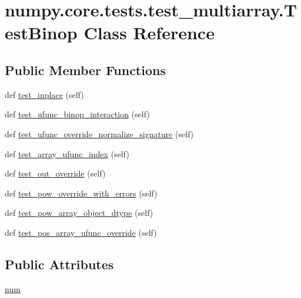 \hypertarget{classnumpy_1_1core_1_1tests_1_1test__multiarray_1_1TestBinop}{}\section{numpy.\+core.\+tests.\+test\+\_\+multiarray.\+Test\+Binop Class Reference}
\label{classnumpy_1_1core_1_1tests_1_1test__multiarray_1_1TestBinop}
\subsection*{Public Member Functions}
\begin{DoxyCompactItemize}
\item 
def \hyperlink{classnumpy_1_1core_1_1tests_1_1test__multiarray_1_1TestBinop_ab9087862ed21c6dd7aa3204f66a7d524}{test\+\_\+inplace} (self)
\item 
def \hyperlink{classnumpy_1_1core_1_1tests_1_1test__multiarray_1_1TestBinop_aca4a51ad09a33f61846b3879658905ea}{test\+\_\+ufunc\+\_\+binop\+\_\+interaction} (self)
\item 
def \hyperlink{classnumpy_1_1core_1_1tests_1_1test__multiarray_1_1TestBinop_a7efe1ea799400f2f69086ee51429700e}{test\+\_\+ufunc\+\_\+override\+\_\+normalize\+\_\+signature} (self)
\item 
def \hyperlink{classnumpy_1_1core_1_1tests_1_1test__multiarray_1_1TestBinop_ad308f12f96a7db36f3c758f6dccc85a4}{test\+\_\+array\+\_\+ufunc\+\_\+index} (self)
\item 
def \hyperlink{classnumpy_1_1core_1_1tests_1_1test__multiarray_1_1TestBinop_af01bff7cc0ca27befae3da1872c3348d}{test\+\_\+out\+\_\+override} (self)
\item 
def \hyperlink{classnumpy_1_1core_1_1tests_1_1test__multiarray_1_1TestBinop_a715118a06a537720e326654d683ca9f6}{test\+\_\+pow\+\_\+override\+\_\+with\+\_\+errors} (self)
\item 
def \hyperlink{classnumpy_1_1core_1_1tests_1_1test__multiarray_1_1TestBinop_a770677fbc96240b64a613d1c7be15218}{test\+\_\+pow\+\_\+array\+\_\+object\+\_\+dtype} (self)
\item 
def \hyperlink{classnumpy_1_1core_1_1tests_1_1test__multiarray_1_1TestBinop_afa966d46fdccc6145255058976b646b9}{test\+\_\+pos\+\_\+array\+\_\+ufunc\+\_\+override} (self)
\end{DoxyCompactItemize}
\subsection*{Public Attributes}
\begin{DoxyCompactItemize}
\item 
\hyperlink{classnumpy_1_1core_1_1tests_1_1test__multiarray_1_1TestBinop_a348bd3862fbca8dc805e7f9f892e38c2}{num}
\end{DoxyCompactItemize}


